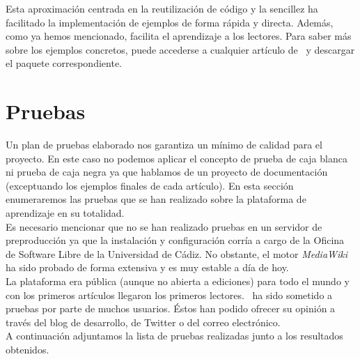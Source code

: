 Esta aproximación centrada en la reutilización de código y la sencillez
ha facilitado la implementación de ejemplos de forma rápida y directa. Además,
como ya hemos mencionado, facilita el aprendizaje a los lectores. Para
saber más sobre los ejemplos concretos, puede accederse a cualquier artículo
de \wiki\ y descargar el paquete correspondiente.\\

\section{Pruebas}

Un plan de pruebas elaborado nos garantiza un mínimo de calidad para
el proyecto. En este caso no podemos aplicar el concepto de prueba
de caja blanca ni prueba de caja negra ya que hablamos de un proyecto
de documentación (exceptuando los ejemplos finales de cada artículo).
En esta sección enumeraremos las pruebas que se han realizado sobre la 
plataforma de aprendizaje en su totalidad.\\

Es necesario mencionar que no se han realizado pruebas en un servidor de
preproducción ya que la instalación y configuración corría a cargo de la
Oficina de Software Libre de la Universidad de Cádiz. No obstante, el motor
\textit{MediaWiki} ha sido probado de forma extensiva y es muy estable
a día de hoy.\\

La plataforma era pública (aunque no abierta a ediciones) para todo el mundo
y con los primeros artículos llegaron los primeros lectores. \wiki\ ha sido
sometido a pruebas por parte de muchos usuarios. Éstos han podido ofrecer
su opinión a través del blog de desarrollo, de Twitter o del correo
electrónico.\\

A continuación adjuntamos la lista de pruebas realizadas junto a los
resultados obtenidos.\\

